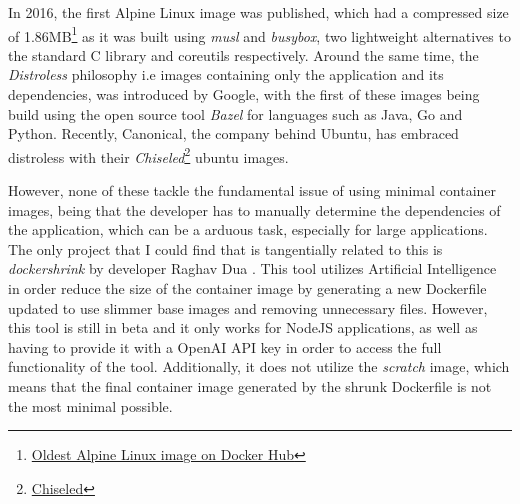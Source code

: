 In 2016, the first Alpine Linux image was published, which had a compressed size of 1.86MB\footnote{\href{https://hub.docker.com/layers/library/alpine/2.6/images/sha256-e9cec9aec697d8b9d450edd32860ecd363f2f3174c8338beb5f809422d182c63}{Oldest Alpine Linux image on Docker Hub}} as it
was built using \textit{musl} and \textit{busybox}, two lightweight alternatives to the standard C library and coreutils respectively.
Around the same time, the \textit{Distroless} philosophy i.e images containing only the application and its dependencies, was introduced by Google, with the 
first of these images being build using the open source tool \textit{Bazel} for languages such as Java, Go and Python.
Recently, Canonical, the company behind Ubuntu, has embraced distroless with their \textit{Chiseled}\footnote{
    \href{https://ubuntu.com/containers/chiseled}{Chiseled}
} ubuntu images.

However, none of these tackle the fundamental issue of using minimal container images,
being that the developer has to manually determine the dependencies of the application,
which can be a arduous task, especially for large applications. The only project that I could find 
that is tangentially related to this is \textit{dockershrink} by developer Raghav Dua \cite{dockershrink}.
This tool utilizes Artificial Intelligence in order reduce the size of the container image by generating a new
Dockerfile updated to use slimmer base images and removing unnecessary files. \cite{dockershrink}
However, this tool is still in beta and it only works for NodeJS applications, as well as having to
provide it with a OpenAI API key in order to access the full functionality of the tool.
Additionally, it does not utilize the \textit{scratch} image, which means that the final 
container image generated by the shrunk Dockerfile is not the most minimal possible.

 